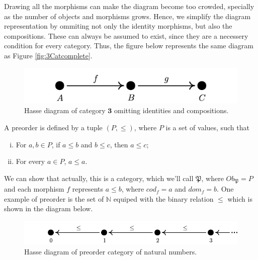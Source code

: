 \begin{example}
Drawing all the morphisms can make the diagram become too crowded, specially
as the number of objects and morphisms grows. Hence, we simplify the
diagram representation by ommiting not only the identity morphisms, but also
the compositions. These can always be assumed to exist, since they are a necessery
condition for every category.
Thus, the figure below represents the same diagram as Figure \ref{fig:3Catcomplete}.

\begin{figure}[H]
  \begin{center}
    \includegraphics{./notebooks/3Catsimple}
  \end{center}
  \caption{Hasse diagram of category $\bm 3$ omitting identities and compositions.}
  \label{fig:3Catsimple}
\end{figure}

\end{example}

\begin{example}[Preorders]
  A preorder is defined by a tuple $(P, \leq)$, where $P$ is a set of values, such that
  \begin{enumerate}[(i)]
    \item For $a,b \in P$, if $a\leq b$ and $b \leq c$, then $a \leq c$;
    \item For every $a \in P$, $a \leq a$.
  \end{enumerate}
  We can show that actually, this is a category, which we'll call $\mathfrak P$,
  where $Ob_\mathfrak P = P$ and each morphism $f$ represents $a \leq b$, where
  $cod_f = a$ and $dom_f = b$.
  One example of preorder is the set of $\mathbb N$ equiped with the binary relation $\leq$
  which is shown in the diagram below.

\begin{figure}[H]
  \begin{center}
    \includegraphics{./notebooks/NCat}
  \end{center}
  \caption{Hasse diagram of preorder category of natural numbers.}
  \label{fig:NCat}
\end{figure}
\end{example}

